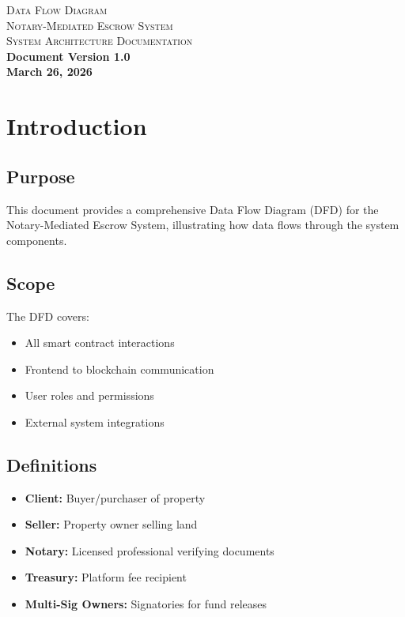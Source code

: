 \documentclass[12pt,a4paper]{article}
\begin{document}
\begin{titlepage}
\vspace*{1in}
\begin{center}
\textcolor{corporate-primary}{\Large\scshape Data Flow Diagram}\\[0.3in]

\textsc{\large Notary-Mediated Escrow System}\\[0.5in]

\textcolor{corporate-secondary}{\Large\scshape System Architecture Documentation}\\[1in]

\textbf{Document Version 1.0}\\
\textbf{March 26, 2026}
\end{center}
\end{titlepage}

\newpage

\section{Introduction}

\subsection{Purpose}
This document provides a comprehensive Data Flow Diagram (DFD) for the Notary-Mediated Escrow System, illustrating how data flows through the system components.

\subsection{Scope}
The DFD covers:
\begin{itemize}
\item All smart contract interactions
\item Frontend to blockchain communication
\item User roles and permissions
\item External system integrations
\end{itemize}

\subsection{Definitions}
\begin{itemize}
\item \textbf{Client:} Buyer/purchaser of property
\item \textbf{Seller:} Property owner selling land
\item \textbf{Notary:} Licensed professional verifying documents
\item \textbf{Treasury:} Platform fee recipient
\item \textbf{Multi-Sig Owners:} Signatories for fund releases
\end{itemize}
\end{document}
